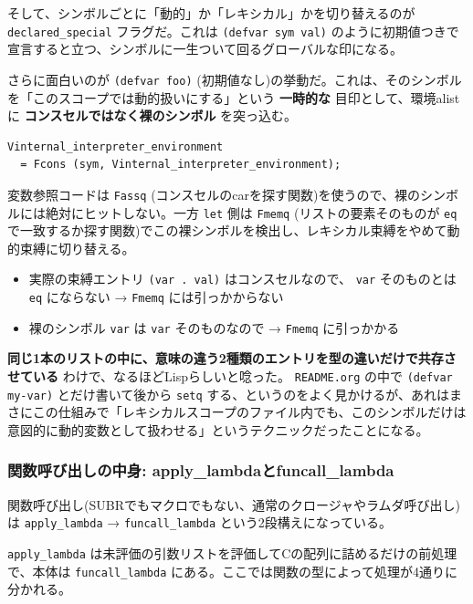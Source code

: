 \documentclass[11pt]{article}
\begin{document}
そして、シンボルごとに「動的」か「レキシカル」かを切り替えるのが \texttt{declared\_special} フラグだ。これは \texttt{(defvar sym val)} のように初期値つきで宣言すると立つ、シンボルに一生ついて回るグローバルな印になる。

さらに面白いのが \texttt{(defvar foo)} (初期値なし)の挙動だ。これは、そのシンボルを「このスコープでは動的扱いにする」という \textbf{一時的な} 目印として、環境alistに \textbf{コンスセルではなく裸のシンボル} を突っ込む。

\begin{verbatim}
Vinternal_interpreter_environment
  = Fcons (sym, Vinternal_interpreter_environment);
\end{verbatim}

変数参照コードは \texttt{Fassq} (コンスセルのcarを探す関数)を使うので、裸のシンボルには絶対にヒットしない。一方 \texttt{let} 側は \texttt{Fmemq} (リストの要素そのものが \texttt{eq} で一致するか探す関数)でこの裸シンボルを検出し、レキシカル束縛をやめて動的束縛に切り替える。

\begin{itemize}
\item 実際の束縛エントリ \texttt{(var . val)} はコンスセルなので、 \texttt{var} そのものとは \texttt{eq} にならない → \texttt{Fmemq} には引っかからない
\item 裸のシンボル \texttt{var} は \texttt{var} そのものなので → \texttt{Fmemq} に引っかかる
\end{itemize}

\textbf{同じ1本のリストの中に、意味の違う2種類のエントリを型の違いだけで共存させている} わけで、なるほどLispらしいと唸った。 \texttt{README.org} の中で \texttt{(defvar my-var)} とだけ書いて後から \texttt{setq} する、というのをよく見かけるが、あれはまさにこの仕組みで「レキシカルスコープのファイル内でも、このシンボルだけは意図的に動的変数として扱わせる」というテクニックだったことになる。
\subsubsection{関数呼び出しの中身: apply\_lambdaとfuncall\_lambda}
\label{sec:org327203e}

関数呼び出し(SUBRでもマクロでもない、通常のクロージャやラムダ呼び出し)は \texttt{apply\_lambda} → \texttt{funcall\_lambda} という2段構えになっている。

\texttt{apply\_lambda} は未評価の引数リストを評価してCの配列に詰めるだけの前処理で、本体は \texttt{funcall\_lambda} にある。ここでは関数の型によって処理が4通りに分かれる。
\end{document}
